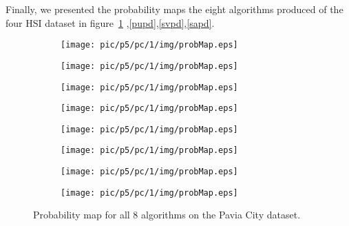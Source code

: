 \documentclass{article}
\begin{document}
	Finally, we presented the probability maps the eight algorithms produced of the four HSI dataset in
	figure~\ref{pcpd} ,\ref{pupd},\ref{svpd},\ref{sapd}.
	\begin{figure}
		\begin{subfigure}{0.12\textwidth}
			\texttt{[image: pic/p5/pc/1/img/probMap.eps]}
			\caption{}
		\end{subfigure}
		\begin{subfigure}{0.12\textwidth}
			\texttt{[image: pic/p5/pc/1/img/probMap.eps]}
			\caption{}
		\end{subfigure}
		\begin{subfigure}{0.12\textwidth}
			\texttt{[image: pic/p5/pc/1/img/probMap.eps]}
			\caption{}
		\end{subfigure}
		\begin{subfigure}{0.12\textwidth}
			\texttt{[image: pic/p5/pc/1/img/probMap.eps]}
			\caption{}
		\end{subfigure}
		\begin{subfigure}{0.12\textwidth}
			\texttt{[image: pic/p5/pc/1/img/probMap.eps]}
			\caption{}
		\end{subfigure}
		\begin{subfigure}{0.12\textwidth}
			\texttt{[image: pic/p5/pc/1/img/probMap.eps]}
			\caption{}
		\end{subfigure}
		\begin{subfigure}{0.12\textwidth}
			\texttt{[image: pic/p5/pc/1/img/probMap.eps]}
			\caption{}
		\end{subfigure}
		\begin{subfigure}{0.12\textwidth}
			\texttt{[image: pic/p5/pc/1/img/probMap.eps]}
			\caption{}
		\end{subfigure}
		\caption{Probability map for all 8 algorithms on the Pavia City dataset.}
		\label{pcpd}
	\end{figure}
\end{document}
